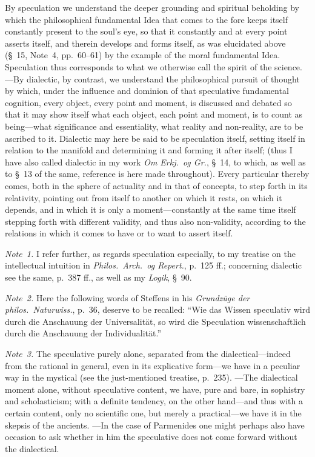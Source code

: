 \documentclass[12pt,a4paper]{book}
\begin{document}
By speculation we understand the deeper grounding and spiritual beholding by which
the philosophical fundamental Idea that comes to the fore keeps itself constantly
present to the soul's eye, so that it constantly and at every point asserts itself,
and therein develops and forms itself, as was elucidated above (\S~15, Note~4,
pp.~60--61) by the example of the moral fundamental Idea. Speculation thus corresponds
to what we otherwise call the spirit of the science. ---By dialectic, by contrast, we
understand the philosophical pursuit of thought by which, under the influence and
dominion of that speculative fundamental cognition, every object, every point and
moment, is discussed and debated so that it may show itself what each object, each
point and moment, is to count as being---what significance and essentiality, what
reality and non-reality, are to be ascribed to it. Dialectic may here be said to be
speculation itself, setting itself in relation to the manifold and determining it and
forming it after itself; (thus I have also called dialectic in my work \textit{Om
Erkj.\ og Gr.}, \S~14, to which, as well as to \S~13 of the same, reference is here
made throughout). Every particular thereby comes, both in the sphere of actuality and
in that of concepts, to step forth in its relativity, pointing out from itself to
another on which it rests, on which it depends, and in which it is only a
moment---constantly at the same time itself stepping forth with different validity,
and thus also non-validity, according to the relations in which it comes to have or to
want to assert itself.

{\small\emph{Note~1.} I refer further, as regards speculation especially, to my
treatise on the intellectual intuition in \textit{Philos.\ Arch.\ og Repert.},
p.~125 ff.; concerning dialectic see the same, p.~387 ff., as well as my
\textit{Logik}, \S~90.\par}

{\small\emph{Note~2.} Here the following words of Steffens in his \textit{Grundzüge
der philos.\ Naturwiss.}, p.~36, deserve to be recalled: ``Wie das Wissen speculativ
wird durch die Anschauung der Universalität, so wird die Speculation wissenschaftlich
durch die Anschauung der Individualität.''\par}

{\small\emph{Note~3.} The speculative purely alone, separated from the
dialectical---indeed from the rational in general, even in its explicative form---we
have in a peculiar way in the mystical (see the just-mentioned treatise, p.~235).
---The dialectical moment alone, without speculative content, we have, pure and bare,
in sophistry and scholasticism; with a definite tendency, on the other hand---and thus
with a certain content, only no scientific one, but merely a practical---we have it in
the skepsis of the ancients. ---In the case of Parmenides one might perhaps also have
occasion to ask whether in him the speculative does not come forward without the
dialectical.\par}
\end{document}
